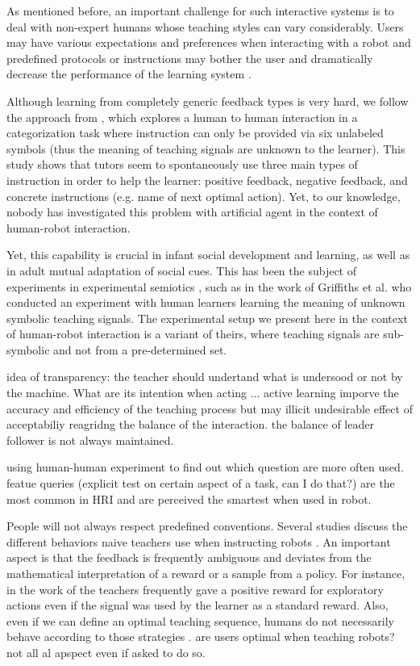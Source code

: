 As mentioned before, an important challenge for such interactive systems is to deal with non-expert humans whose teaching styles can vary considerably. Users may have various expectations and preferences when interacting with a robot and predefined protocols or instructions may bother the user and dramatically decrease the performance of the learning system \cite{rouanet2013impact}. 

Although learning from completely generic feedback types is very hard, we follow the approach from \cite{griffiths2012bottom}, which explores a human to human interaction in a categorization task where instruction can only be provided via six unlabeled symbols (thus the meaning of teaching signals are unknown to the learner). This study shows that tutors seem to spontaneously use three main types of instruction in order to help the learner: positive feedback, negative feedback, and concrete instructions (e.g. name of next optimal action). Yet, to our knowledge, nobody has investigated this problem with artificial agent in the context of human-robot interaction.


Yet, this capability is crucial in infant social development and learning, as well as in adult mutual adaptation of social cues. This has been the subject of experiments in experimental semiotics \cite{galantucci2009experimental}, such as in the work of Griffiths et al. \cite{griffiths2012bottom} who conducted an experiment with human learners learning the meaning of unknown symbolic teaching signals. The experimental setup we present here in the context of human-robot interaction is a variant of theirs, where teaching signals are sub-symbolic and not from a pre-determined set.

idea of transparency: the teacher should undertand what is undersood or not by the machine. What are its intention when acting ...
\cite{chao2010transparent} active learning imporve the accuracy and efficiency of the teaching process but may illicit undesirable effect of acceptabiliy reagridng the balance of the interaction. the balance of leader follower is not always maintained.

\cite{cakmak2012designing} using human-human experiment to find out which question are more often used. featue queries (explicit test on certain aspect of a task, can I do that?) are the most common in HRI and are perceived the smartest when used in robot. 

People will not always respect predefined conventions. Several studies discuss the different behaviors naive teachers use when instructing robots \cite{thomaz2008teachable,Cakmak2010optimality}. An important aspect is that the feedback is frequently ambiguous and deviates from the mathematical interpretation of a reward or a sample from a policy. For instance, in the work of \cite{thomaz2008teachable} the teachers frequently gave a positive reward for exploratory actions even if the signal was used by the learner as a standard reward. Also, even if we can define an optimal teaching sequence, humans do not necessarily behave according to those strategies \cite{Cakmak2010optimality}. are users optimal when teaching robots? not all al apspect even if asked to do so.

